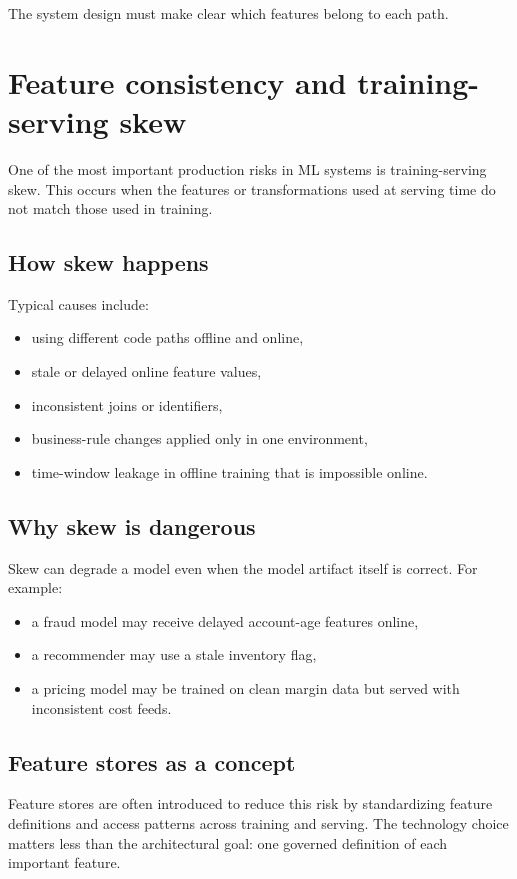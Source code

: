 The system design must make clear which features belong to each path.

\section{Feature consistency and training-serving skew}
One of the most important production risks in ML systems is training-serving skew.
This occurs when the features or transformations used at serving time do not match those used in training.

\subsection{How skew happens}
Typical causes include:
\begin{itemize}
  \item using different code paths offline and online,
  \item stale or delayed online feature values,
  \item inconsistent joins or identifiers,
  \item business-rule changes applied only in one environment,
  \item time-window leakage in offline training that is impossible online.
\end{itemize}

\subsection{Why skew is dangerous}
Skew can degrade a model even when the model artifact itself is correct.
For example:
\begin{itemize}
  \item a fraud model may receive delayed account-age features online,
  \item a recommender may use a stale inventory flag,
  \item a pricing model may be trained on clean margin data but served with inconsistent cost feeds.
\end{itemize}

\subsection{Feature stores as a concept}
Feature stores are often introduced to reduce this risk by standardizing feature definitions and access patterns across training and serving.
The technology choice matters less than the architectural goal: one governed definition of each important feature.


